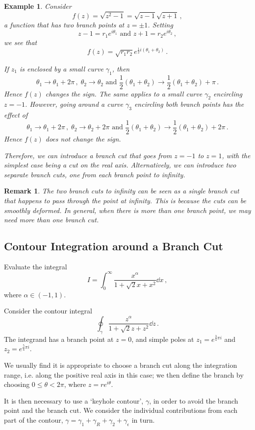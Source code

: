 \documentclass{article}
\theoremstyle{plain}\theoremheaderfont{\normalfont\itshape}\theorembodyfont{\rmfamily}\theoremseparator{.}\newtheorem*{rem}{Remark}\newtheorem*{ex}{Example}\newtheorem*{proof}{Proof}\newtheorem*{altp}{Alternative proof}
\theoremstyle{plain}\theoremheaderfont{\normalfont\bfseries}\theorembodyfont{\rmfamily}\theoremseparator{.}\newtheorem{thm}{Theorem}[section]\newtheorem{lem}[thm]{Lemma}\newtheorem{prop}[thm]{Proposition}\newtheorem*{cor}{Corollary}\newtheorem{defn}[thm]{Definition}\newtheorem{clm}[thm]{Claim}\newtheorem{clminproof}{Claim}
\theoremstyle{break}\theoremheaderfont{\normalfont\itshape}\theorembodyfont{\rmfamily}\theoremseparator{.\medskip}\newtheorem*{proofskip}{Proof}\newtheorem*{exs}{Examples}\newtheorem*{rems}{Remarks}
\theoremstyle{break}\theoremheaderfont{\normalfont\bfseries}\theorembodyfont{\rmfamily}\theoremseparator{.\medskip}\newtheorem{lemskip}[thm]{Lemma}\newtheorem{defnskip}[thm]{Definition}\newtheorem{propskip}[thm]{Proposition}\newtheorem{thmskip}[thm]{Theorem}
\numberwithin{equation}{section}
\begin{document}
	\begin{ex}
		Consider
		\[f(z)=\sqrt{z^2-1}=\sqrt{z-1}\sqrt{z+1}\,,\]
		a function that has two branch points at \(z=\pm 1\). Setting
		\[z-1=r_1e^{i\theta_1}\text{ and }z+1=r_2e^{i\theta_2}\,,\]
		we see that
		\[f(z)=\sqrt{r_1r_2}e^{\frac{1}{2}i(\theta_1+\theta_2)}\,.\]
		
		If \(z_1\) is enclosed by a small curve \(\gamma_1\), then
		\[\theta_1\to\theta_1+2\pi\,,\;\theta_2\to\theta_2\text{ and }\frac{1}{2}(\theta_1+\theta_2)\to\frac{1}{2}(\theta_1+\theta_2)+\pi\,.\]
		Hence \(f(z)\) changes the sign. The same applies to a small curve \(\gamma_2\) encircling \(z=-1\). However, going around a curve \(\gamma_3\) encircling both branch points has the effect of
		\[\theta_1\to\theta_1+2\pi\,,\;\theta_2\to\theta_2+2\pi\text{ and }\frac{1}{2}(\theta_1+\theta_2)\to\frac{1}{2}(\theta_1+\theta_2)+2\pi\,.\]
		Hence \(f(z)\) does not change the sign.

		Therefore, we can introduce a branch cut that goes from \(z=-1\) to \(z=1\), with the simplest case being a cut on the real axis. Alternatively, we can introduce two separate branch cuts, one from each branch point to infinity.
	\end{ex}
	\begin{rem}
		The two branch cuts to infinity can be seen as a single branch cut that happens to pass through the point at infinity. This is because the cuts can be smoothly deformed. In general, when there is more than one branch point, we may need more than one branch cut.
	\end{rem}
	\subsection{Contour Integration around a Branch Cut}
	Evaluate the integral
	\[I=\int_{0}^{\infty}\frac{x^\alpha}{1+\sqrt{2}x+x^2}\dd{x}\,,\]
	where \(\alpha\in(-1,1)\).
	
	Consider the contour integral
	\[\oint_\gamma\frac{z^\alpha}{1+\sqrt{2}z+z^2}\dd{z}\,.\]
	The integrand has a branch point at \(z=0\), and simple poles at \(z_1=e^{\frac{3}{4}\pi i}\) and \(z_2=e^{\frac{5}{4}\pi i}\).

	We usually find it is appropriate to choose a branch cut along the integration range, i.e. along the positive real axis in this case; we then define the branch by choosing \(0\le\theta<2\pi\), where \(z=re^{i\theta}\).

	It is then necessary to use a `keyhole contour', \(\gamma\), in order to avoid the branch point and the branch cut. We consider the individual contributions from each part of the contour, \(\gamma=\gamma_1+\gamma_R+\gamma_2+\gamma_\epsilon\) in turn.
\end{document}
